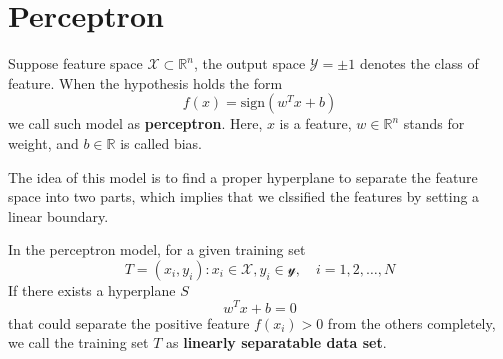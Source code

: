 \chapter{Perceptron}

\begin{define}[Perceptron]
    Suppose feature space $\mathcal{X}\subset\mathbb{R}^n$, the output space $\mathcal{Y}={\pm 1}$ denotes the class of feature. When the hypothesis holds the form
    \[f(x)= \text{sign}(w^Tx+b)\]
    we call such model as \textbf{perceptron}. Here, $x$ is a feature, $w\in \mathbb{R}^n$ stands for weight, and $b \in \mathbb{R}$ is called bias.
\end{define}

The idea of this model is to find a proper hyperplane to separate the feature space into two parts, which implies that we clssified the features by setting a linear boundary.

\begin{define}
    In the perceptron model, for a given training set 
    \[T={(x_i,y_i):x_i\in \mathcal{X},y_i\in\mathcal{y},\quad i=1,2,\ldots,N}\]
    If there exists a hyperplane $S$
    \[w^Tx+b=0\]
    that could separate the positive feature $f(x_i)>0$ from the others completely, we call the training set $T$ as \textbf{linearly separatable data set}. 
\end{define}

